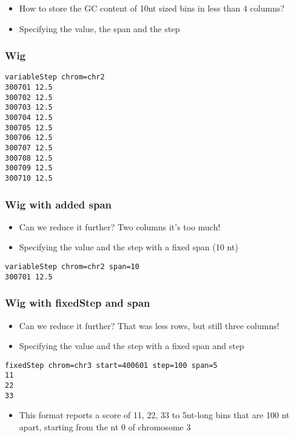 \documentclass{beamer}
\begin{document}
\begin{frame}[fragile]

  \begin{itemize}
  \item How to store the GC content of 10nt sized bins in less than 4 columns?
  \item Specifying the value, the span and the step
  \end{itemize}

  \frametitle{Wig}
\begin{verbatim}
variableStep chrom=chr2
300701 12.5
300702 12.5
300703 12.5
300704 12.5
300705 12.5
300706 12.5
300707 12.5
300708 12.5
300709 12.5
300710 12.5
\end{verbatim}
\end{frame}


\begin{frame}[fragile]
  \frametitle{Wig with added span}

  \begin{itemize}
  \item Can we reduce it further? Two columns it's too much! 
  \item Specifying the value and the step with a fixed span (10 nt)
  \end{itemize}

\begin{verbatim}
variableStep chrom=chr2 span=10
300701 12.5
\end{verbatim}
\end{frame}


\begin{frame}[fragile]
  \frametitle{Wig with fixedStep and span}
  \begin{itemize}
  \item Can we reduce it further? That was less rows, but still three columns!
  \item Specifying the value and the step with a fixed span and step
  \end{itemize}

\begin{verbatim}
fixedStep chrom=chr3 start=400601 step=100 span=5
11
22
33 
\end{verbatim}

  \begin{itemize}
  \item This format reports a score of 11, 22, 33 to 5nt-long bins that are 100 nt apart, starting from the nt 0 of chromosome 3
  \end{itemize}
\end{frame}
\end{document}
